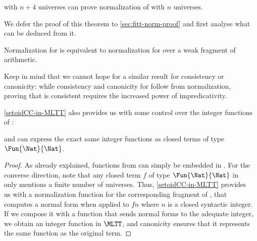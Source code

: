 \begin{theorem}\label{setoidCC-in-MLTT}
  \MLTT with \( n + 4 \) universes can prove normalization of \SetoidCC with
  \( n \) universes.
\end{theorem}

We defer the proof of this theorem to \cref{sec:fitt-norm-proof} and
first analyse what can be deduced from it.

\begin{corollary}
  Normalization for \SetoidCC is equivalent to normalization for \MLTT
  over a weak fragment of arithmetic.
\end{corollary}

Keep in mind that we cannot hope for a similar result for consistency or
canonicity: while consistency and canonicity for \MLTT follow from
normalization, proving that \SetoidCC is consistent requires the increased
power of impredicativity.

\cref{setoidCC-in-MLTT} also provides us with some
control over the integer functions of \SetoidCC:

\begin{corollary}\label{integer-functions}
  \SetoidCC and \MLTT can express the exact same integer functions
  as closed terms of type \( \Fun{\Nat}{\Nat} \).
\end{corollary}

\begin{proof}
  As already explained, functions from \MLTT can simply be embedded in
  \SetoidCC.
  For the converse direction, note that any closed term \( f \) of
  type \( \Fun{\Nat}{\Nat} \) in \SetoidCC only mentions a finite number of
  universes.
%
  Thus, \cref{setoidCC-in-MLTT} provides us with a
  normalization function for the corresponding fragment of \SetoidCC,
  that computes a normal form when applied to \( f n \) where \( n \)
  is a closed syntactic integer.
%
  If we compose it with a function that sends normal forms to the
  adequate integer, %
  we obtain an integer function in \( \MLTT \), and canonicity ensures
  that it represents the same function as the original \SetoidCC term.
\end{proof}

